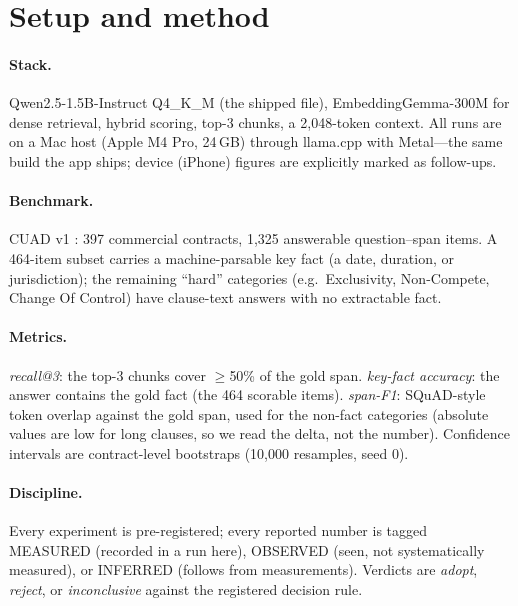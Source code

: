 \documentclass[11pt]{article}
\begin{document}
\section{Setup and method}\label{sec:method}
\paragraph{Stack.} Qwen2.5-1.5B-Instruct Q4\_K\_M \citep{qwen2025} (the shipped file),
EmbeddingGemma-300M \citep{embeddinggemma} for dense retrieval, hybrid scoring, top-3 chunks, a
2{,}048-token context. All runs are on a Mac host (Apple M4 Pro, 24\,GB) through
llama.cpp \citep{llamacpp} with Metal---the same build the app ships; device (iPhone) figures
are explicitly marked as follow-ups.

\paragraph{Benchmark.} CUAD v1 \citep{hendrycks2021cuad}: 397 commercial contracts, 1{,}325
answerable question--span items. A 464-item subset carries a machine-parsable key fact (a date,
duration, or jurisdiction); the remaining ``hard'' categories (e.g.\ Exclusivity, Non-Compete,
Change Of Control) have clause-text answers with no extractable fact.

\paragraph{Metrics.} \emph{recall@3}: the top-3 chunks cover $\geq$50\% of the gold span.
\emph{key-fact accuracy}: the answer contains the gold fact (the 464 scorable items).
\emph{span-F1}: SQuAD-style token overlap against the gold span, used for the non-fact
categories (absolute values are low for long clauses, so we read the delta, not the number).
Confidence intervals are contract-level bootstraps (10{,}000 resamples, seed 0).

\paragraph{Discipline.} Every experiment is pre-registered; every reported number is tagged
MEASURED (recorded in a run here), OBSERVED (seen, not systematically measured), or INFERRED
(follows from measurements). Verdicts are \emph{adopt}, \emph{reject}, or \emph{inconclusive}
against the registered decision rule.
\end{document}
